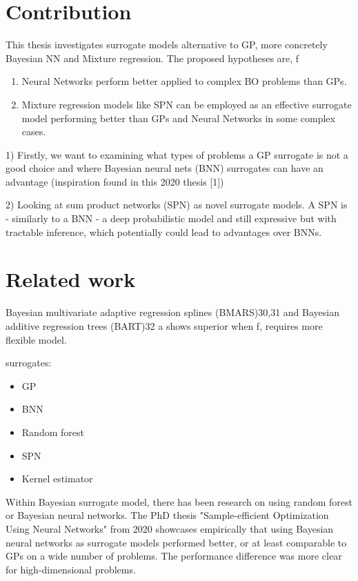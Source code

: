 \section{Contribution}
This thesis investigates surrogate models alternative to GP, more concretely Bayesian NN
and Mixture regression. The proposed hypotheses are, 
f
\begin{enumerate}
    \item Neural Networks perform better applied to complex BO problems than GPs.
    \item Mixture regression models like SPN can be employed as an effective surrogate model
    performing better than GPs and Neural Networks in some complex cases. 
\end{enumerate}

1)     Firstly, we want to examining what types of problems a GP surrogate is not a good choice and
where Bayesian neural nets (BNN) surrogates can have an advantage (inspiration found in this 2020
thesis [1])
    
2) Looking at sum product networks (SPN) as novel surrogate models. A SPN is - similarly to a BNN
- a deep probabilistic model and still expressive but with tractable inference, which potentially
could lead to advantages over BNNs. 

\section{Related work}
Bayesian multivariate adaptive
regression splines (BMARS)30,31 and Bayesian additive regression
trees (BART)32 a
shows superior when f, requires more flexible model. 

surrogates: 
\begin{itemize}
    \item GP
    \item BNN
    \item Random forest
    \item SPN
    \item Kernel estimator
\end{itemize}

Within Bayesian surrogate model, there has been research on using random forest or Bayesian neural 
networks. The PhD thesis "Sample-efficient Optimization Using Neural Networks" from 2020 \cite{PhDthesis}
showcases empirically that using Bayesian neural networks as surrogate models performed better,
or at least comparable to GPs on a wide number of problems. The performance difference was more
clear for high-dimensional problems. 

